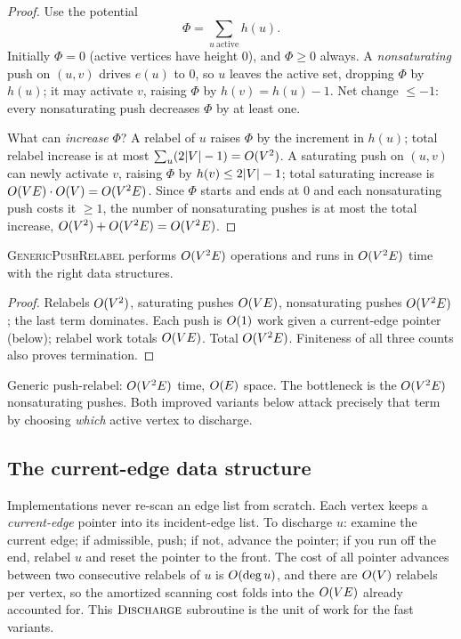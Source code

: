 \begin{proof}
Use the potential
\[
  \Phi = \sum_{u\ \text{active}} h(u).
\]
Initially $\Phi=0$ (active vertices have height $0$), and $\Phi\ge0$ always. A \emph{nonsaturating} push on $(u,v)$ drives $e(u)$ to $0$, so $u$ leaves the active set, dropping $\Phi$ by $h(u)$; it may activate $v$, raising $\Phi$ by $h(v)=h(u)-1$. Net change $\le -1$: every nonsaturating push decreases $\Phi$ by at least one.

What can \emph{increase} $\Phi$? A relabel of $u$ raises $\Phi$ by the increment in $h(u)$; total relabel increase is at most $\sum_u (2\lvert V\rvert-1)=O(V^2)$. A saturating push on $(u,v)$ can newly activate $v$, raising $\Phi$ by $h(v)\le 2\lvert V\rvert-1$; total saturating increase is $O(VE)\cdot O(V)=O(V^2E)$. Since $\Phi$ starts and ends at $0$ and each nonsaturating push costs it $\ge1$, the number of nonsaturating pushes is at most the total increase, $O(V^2)+O(V^2E)=O(V^2E)$.
\end{proof}

\begin{theorem}
\label{ch13:thm-generic-time}
\textsc{GenericPushRelabel} performs $O(V^2E)$ operations and runs in $O(V^2E)$ time with the right data structures.
\end{theorem}

\begin{proof}
Relabels $O(V^2)$, saturating pushes $O(VE)$, nonsaturating pushes $O(V^2E)$; the last term dominates. Each push is $O(1)$ work given a current-edge pointer (below); relabel work totals $O(VE)$. Total $O(V^2E)$. Finiteness of all three counts also proves termination.
\end{proof}

\begin{complexitybox}
Generic push-relabel: $O(V^2 E)$ time, $O(E)$ space. The bottleneck is the $O(V^2E)$ nonsaturating pushes. Both improved variants below attack precisely that term by choosing \emph{which} active vertex to discharge.
\end{complexitybox}

\subsection*{The current-edge data structure}

Implementations never re-scan an edge list from scratch. Each vertex keeps a \emph{current-edge} pointer into its incident-edge list. To discharge $u$: examine the current edge; if admissible, push; if not, advance the pointer; if you run off the end, relabel $u$ and reset the pointer to the front. The cost of all pointer advances between two consecutive relabels of $u$ is $O(\deg u)$, and there are $O(V)$ relabels per vertex, so the amortized scanning cost folds into the $O(VE)$ already accounted for. This $\textsc{Discharge}$ subroutine is the unit of work for the fast variants.

